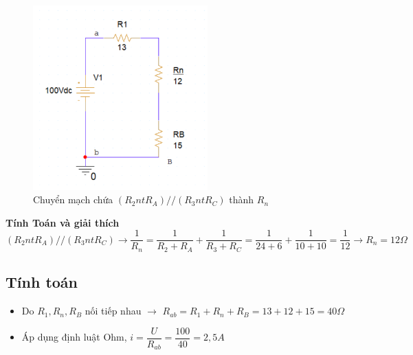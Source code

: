     \begin{figure}[!htbp]
    \centering
    \includegraphics[width=0.6\textwidth]{graphics/ex6/f3.png}
    \caption{Chuyển mạch chứa \((R_2 nt R_A) // (R_3 nt R_C)\) thành \(R_n\)}
    \end{figure}
    \begin{center}
        \textbf{Tính Toán và giải thích}\\
        \((R_2 nt R_A) // (R_3 nt R_C) \rightarrow \dfrac{1}{R_n} = \dfrac{1}{R_2 + R_A} + \dfrac{1}{R_3 + R_C} = \dfrac{1}{24 + 6} + \dfrac{1}{10+10} = \dfrac{1}{12} \rightarrow R_n = 12 \Omega \)
    \end{center}
    \subsection{Tính toán}
    \begin{itemize}
        \item Do \(R_1, R_n, R_B\) nối tiếp nhau \(\rightarrow \) \(R_{ab} = R_1 + R_n + R_B = 13 + 12 + 15 = 40 \Omega \)
        \item Áp dụng định luật Ohm, \(i = \dfrac{U}{R_{ab}} = \dfrac{100}{40} = 2,5 A\)
    \end{itemize}
